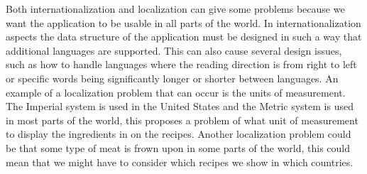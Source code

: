 Both internationalization and localization can give some problems because we want the application to be usable in all parts of the world. In internationalization aspects the data structure of the application must be designed in such a way that additional languages are supported. This can also cause several design issues, such as how to handle languages where the reading direction is from right to left or specific words being significantly longer or shorter between languages.
An example of a localization problem that can occur is the units of measurement. The Imperial system is used in the United States and the Metric system is used in most parts of the world, this proposes a problem of what unit of measurement to display the ingredients in on the recipes. Another localization problem could be that some type of meat is frown upon in some parts of the world, this could mean that we might have to consider which recipes we show in which countries. 
